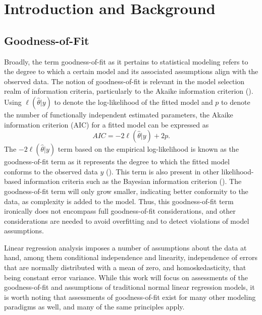 \documentclass[12pt]{article} %
\renewcommand{\theequation}{\thesection\arabic{equation}}
\theoremstyle{definition}
\begin{document}
\def\thefigure{\arabic{figure}}
\def\thetable{\arabic{table}}

\renewcommand{\theequation}{\thesection.\arabic{equation}}


\fontsize{12}{14pt plus.8pt minus .6pt}\selectfont



\section{Introduction and Background}

	\subsection*{Goodness-of-Fit}

    	Broadly, the term goodness-of-fit as it pertains to statistical modeling refers to the degree to which a certain model
		and its associated assumptions align with the observed data. The notion of goodness-of-fit is relevant in the model selection realm of information criteria, particularly to the Akaike
		information criterion (\cite{Akaike}). Using $\ell(\hat{\theta}|y)$ to denote the log-likelihood of the fitted model and $p$ to denote the
		number of functionally independent estimated parameters, the Akaike information criterion (AIC) for a fitted model can be expressed as
		\begin{equation*}
			AIC = -2 \ell(\hat{\theta}|y) + 2 p.
		\end{equation*}
		The $-2 \ell(\hat{\theta}|y)$ term based on the empirical log-likelihood is known as the goodness-of-fit term as it represents the degree to which the fitted model
		conforms to the observed data $y$ (\cite{Cavanaugh}). This term is also present in other likelihood-based information criteria such as the Bayesian information criterion (\cite{Schwarz}).
		The goodness-of-fit term will only grow smaller, indicating better conformity to the data, as complexity is added to the model. Thus, this goodness-of-fit term ironically does
		not encompass full goodness-of-fit considerations, and other considerations are needed to avoid overfitting and to detect violations of model assumptions.

		Linear regression analysis imposes a number of assumptions about the data at hand, among them conditional independence and linearity, independence of errors that are normally distributed with a mean of zero,
		and homoskedasticity, that being constant error variance. While this work will focus on assessments of the goodness-of-fit and assumptions of traditional normal linear regression models, it is worth noting
		that assessments of goodness-of-fit exist for many other modeling paradigms as well, and many of the same principles apply.
		
\end{document}
